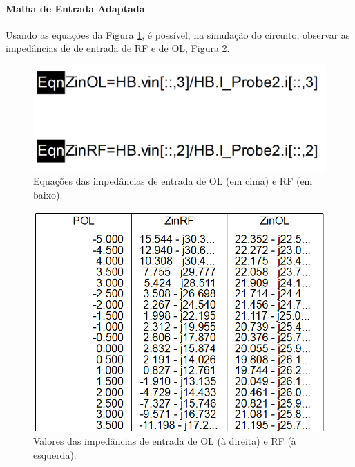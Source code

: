 \documentclass[11pt]{article}
\numberwithin{equation}{section}
\begin{document}
\paragraph{Malha de Entrada Adaptada} \hspace{0pt} 

Usando as equações da Figura \ref{fig:Eq}, é possível, na simulação do circuito, observar as impedâncias de de entrada de RF e de OL, Figura \ref{fig:Imp_OL_RF}.

\begin{figure}[h]
\centering
\includegraphics[keepaspectratio=true, scale=0.2]{exps/Eq}
\vspace{-0.5em}
\caption{Equações das impedâncias de entrada de OL (em cima) e RF (em baixo).}
\vspace{-0.8em}
\label{fig:Eq}
\end{figure}


\begin{figure}[h]
\centering
\includegraphics[keepaspectratio=true, scale=0.45]{exps/Z_20}
\vspace{-0.5em}
\caption{Valores das impedâncias de entrada de OL (à direita) e RF (à esquerda).}
\vspace{-0.8em}
\label{fig:Imp_OL_RF}
\end{figure}
\end{document}
